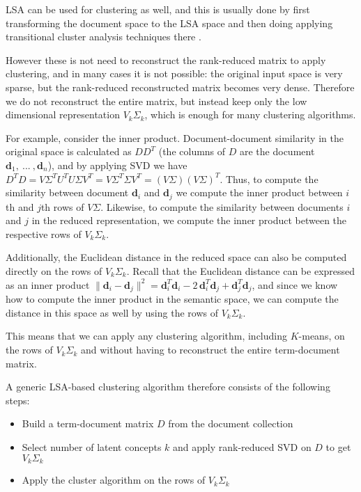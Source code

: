 LSA can be used for clustering as well, and this is usually done
by first transforming the document space to the LSA space
and then doing applying transitional cluster analysis techniques
there \cite{schutze1997projections}.

However these is not need to reconstruct the rank-reduced matrix
to apply clustering, and in many cases it is not possible:
the original input space is very sparse, but the rank-reduced
reconstructed matrix becomes very dense. Therefore we do not
reconstruct the entire matrix, but instead keep only the low
dimensional representation $V_k \Sigma_k$, which is enough
for many clustering algorithms.

For example, consider the inner product. Document-document similarity
in the original space is calculated as $D D^T$ (the columns of $D$
are the document $\mathbf d_1, \ ... \ , \mathbf d_n$), and by applying
SVD we have $D^T D = V \Sigma^T U^T U \Sigma V^T = V \Sigma^T \Sigma V^T =
(V \Sigma) (V \Sigma)^T$. Thus, to compute the similarity between
document $\mathbf d_i$ and $\mathbf d_j$ we compute the inner product
between $i$th and $j$th rows of $V \Sigma$. Likewise, to compute
the similarity between documents $i$ and $j$ in the reduced representation,
we compute the inner product between the respective rows of $V_k \Sigma_k$.

Additionally, the Euclidean distance in the reduced space can also be computed
directly on the rows of $V_k \Sigma_k$. Recall that the Euclidean distance can
be expressed as an inner product
$\| \mathbf d_i - \mathbf d_j \|^2 = \mathbf d_i^T \mathbf d_i - 2 \, \mathbf d_i^T \mathbf d_j + \mathbf d_j^T \mathbf d_j$, and since we know how to compute the inner product
in the semantic space, we can compute the distance in this space as well
by using the rows of $V_k \Sigma_k$.

This means that we can apply any clustering algorithm,
including $K$-means, on the rows of $V_k \Sigma_k$ and without having
to reconstruct the entire term-document matrix.

A generic LSA-based clustering algorithm therefore consists of the following steps:

\begin{itemize}
\itemsep1pt\parskip0pt
  \item Build a term-document matrix $D$ from the document collection
  \item Select number of latent concepts $k$ and apply rank-reduced SVD on $D$ to get $V_k \Sigma_k$
  \item Apply the cluster algorithm on the rows of $V_k \Sigma_k$
\end{itemize}


